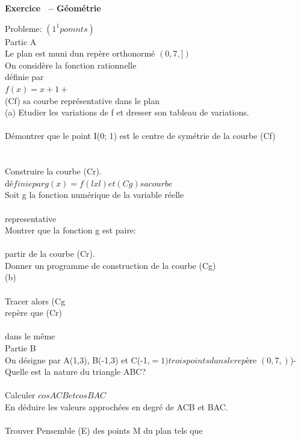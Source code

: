 \documentclass[12pt,a4paper]{article}
\newcounter{exercice}
\newenvironment{exercice}[1][Mathématiques]{%
    \refstepcounter{exercice}%
    \par\medskip\noindent
    \textbf{\large Exercice \theexercice\ -- #1}%
    \par\smallskip
}{%
    \par\medskip
}
\begin{document}
\begin{exercice}[Géométrie]
\label{ex:21}

Probleme: $(1^{1} pomnts)$\\
Partic A\\
Le plan est muni dun repère orthonormé $(0, 7,])$\\
On considère la fonction rationnelle\\
définie par\\
$f(x) =x+1 +$\\
(Cf) sa courbe représentative dans le plan\\
(a)   Etudier les variations de f et dresser son tableau de variations.\\
[3pts\\
Préciser les asymptotes à la courbe (Cf) de f .\\
[0,Spt]\\
Démontrer que le point I(0; 1) est le centre de symétrie de la courbe (Cf)\\
[lpt]\\
[1,Spt]\\
Construire la courbe (Cr).\\
dé$finie par g(x) = f(lxl) et (Cg) sa courbe$\\
Soit g la fonction numérique de la variable réelle\\
[0,Spt]\\
representative\\
Montrer que la fonction g est paire:\\
[0,5pt]\\
partir de la courbe (Cr).\\
Donner un programme de construction de la courbe (Cg)\\
(b)\\
[0,Spt]\\
Tracer alors (Cg\\
repère que (Cr)\\
[0,5pt]\\
dans le même\\
Partie B\\
On désigne par A(1,3), B(-1,3) et C(-1,$ =1) trois points dans le rep$ère $(0, 7, )$)-\\
Quelle est la nature du triangle ABC?\\
[0,Spt]\\
Calculer $cos ACB et cos BAC$\\
En déduire les valeurs approchées en degré de ACB et BAC.\\
[2pts\\
MA^\{2\}\\
$MB^{2} = 2^{0}$\\
[lpt]\\
Trouver Pensemble (E) des points M du plan tels que\\

\end{exercice}
\end{document}
